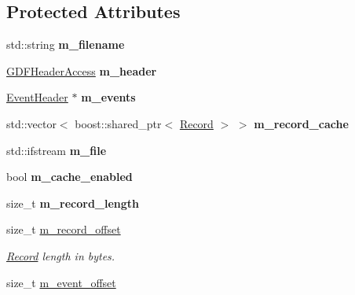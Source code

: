 \subsection*{Protected Attributes}
\begin{DoxyCompactItemize}
\item 
\hypertarget{classgdf_1_1_reader_a1cbc1a56b834026470b2c58b8ace18da}{
std::string {\bfseries m\_\-filename}}
\label{classgdf_1_1_reader_a1cbc1a56b834026470b2c58b8ace18da}

\item 
\hypertarget{classgdf_1_1_reader_a074adb287bd8f4f2c78eadac4003ef70}{
\hyperlink{classgdf_1_1_g_d_f_header_access}{GDFHeaderAccess} {\bfseries m\_\-header}}
\label{classgdf_1_1_reader_a074adb287bd8f4f2c78eadac4003ef70}

\item 
\hypertarget{classgdf_1_1_reader_a404e8fe0871d638a4082ea3e3d304849}{
\hyperlink{classgdf_1_1_event_header}{EventHeader} $\ast$ {\bfseries m\_\-events}}
\label{classgdf_1_1_reader_a404e8fe0871d638a4082ea3e3d304849}

\item 
\hypertarget{classgdf_1_1_reader_a98f8657c10545dbf96aa8815de772d91}{
std::vector$<$ boost::shared\_\-ptr$<$ \hyperlink{classgdf_1_1_record}{Record} $>$ $>$ {\bfseries m\_\-record\_\-cache}}
\label{classgdf_1_1_reader_a98f8657c10545dbf96aa8815de772d91}

\item 
\hypertarget{classgdf_1_1_reader_a393cf77dab3a8ede289da24fdb310372}{
std::ifstream {\bfseries m\_\-file}}
\label{classgdf_1_1_reader_a393cf77dab3a8ede289da24fdb310372}

\item 
\hypertarget{classgdf_1_1_reader_ad77fae214888cd06b33e8b487a990d0f}{
bool {\bfseries m\_\-cache\_\-enabled}}
\label{classgdf_1_1_reader_ad77fae214888cd06b33e8b487a990d0f}

\item 
\hypertarget{classgdf_1_1_reader_a5a0980f98d8e438da98594dc4a7c06c8}{
size\_\-t {\bfseries m\_\-record\_\-length}}
\label{classgdf_1_1_reader_a5a0980f98d8e438da98594dc4a7c06c8}

\item 
\hypertarget{classgdf_1_1_reader_a57f8b15044b4f5f396291e648dd48160}{
size\_\-t \hyperlink{classgdf_1_1_reader_a57f8b15044b4f5f396291e648dd48160}{m\_\-record\_\-offset}}
\label{classgdf_1_1_reader_a57f8b15044b4f5f396291e648dd48160}

\begin{DoxyCompactList}\small\item\em \hyperlink{classgdf_1_1_record}{Record} length in bytes. \item\end{DoxyCompactList}\item 
\hypertarget{classgdf_1_1_reader_a6cd9deb54aa60d60cdd3f99a9d090960}{
size\_\-t \hyperlink{classgdf_1_1_reader_a6cd9deb54aa60d60cdd3f99a9d090960}{m\_\-event\_\-offset}}
\label{classgdf_1_1_reader_a6cd9deb54aa60d60cdd3f99a9d090960}


\end{DoxyCompactItemize}
